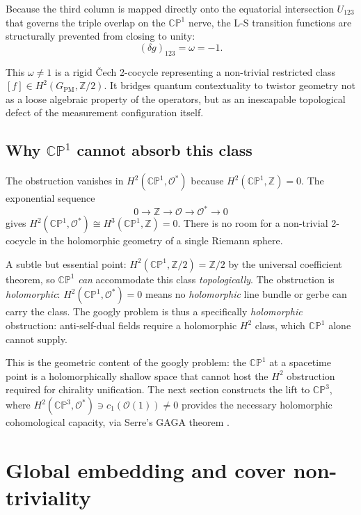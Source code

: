 \documentclass[11pt,a4paper]{article}
\theoremstyle{remark}
\newcommand{\CP}{\mathbb{CP}}
\newcommand{\Z}{\mathbb{Z}}
\newcommand{\cO}{\mathcal{O}}
\begin{document}
Because the third column is mapped directly onto the equatorial
intersection $U_{123}$ that governs the triple overlap on the
$\CP^1$ nerve, the L-S transition functions are structurally
prevented from closing to unity:
\[
  (\delta g)_{123} = \omega = -1.
\]

This $\omega \neq 1$ is a rigid \v{C}ech 2-cocycle representing a
non-trivial restricted class
$[f] \in H^2(G_{\text{PM}}, \Z/2)$.
It bridges quantum contextuality to twistor geometry not as a
loose algebraic property of the operators, but as an inescapable
topological defect of the measurement configuration itself.

\subsection{Why $\CP^1$ cannot absorb this class}

The obstruction vanishes in $H^2(\CP^1, \cO^*)$ because
$H^2(\CP^1, \Z) = 0$. The exponential sequence
\[
  0 \to \Z \to \cO \to \cO^* \to 0
\]
gives $H^2(\CP^1, \cO^*) \cong H^3(\CP^1, \Z) = 0$.
There is no room for a non-trivial 2-cocycle in the holomorphic
geometry of a single Riemann sphere.

A subtle but essential point: $H^2(\CP^1, \Z/2) = \Z/2$ by the
universal coefficient theorem, so $\CP^1$ \emph{can} accommodate this
class \emph{topologically}. The obstruction is \emph{holomorphic}:
$H^2(\CP^1, \cO^*) = 0$ means no \emph{holomorphic} line bundle or
gerbe can carry the class. The googly problem is thus a specifically
\emph{holomorphic} obstruction: anti-self-dual fields require a
holomorphic $H^2$ class, which $\CP^1$ alone cannot supply.

This is the geometric content of the googly problem:
the $\CP^1$ at a spacetime point is a holomorphically shallow
space that cannot host the $H^2$ obstruction required for
chirality unification. The next section constructs the lift to
$\CP^3$, where $H^2(\CP^3, \cO^*) \ni c_1(\cO(1)) \neq 0$
provides the necessary holomorphic cohomological capacity,
via Serre's GAGA theorem \cite{SerreGAGA}.

\section[Global Embedding and Cover Non-Triviality]
  {Global embedding and cover non-triviality}
\label{sec:phi-construction}
\end{document}
